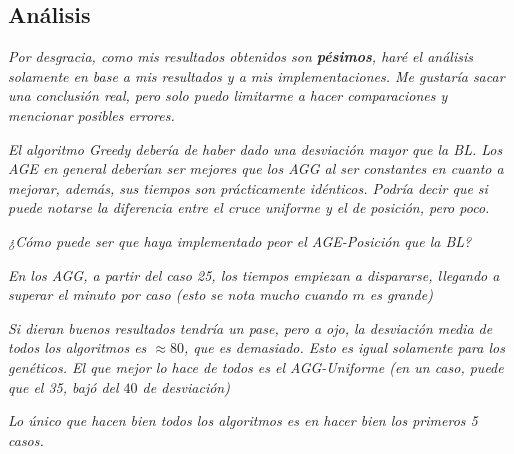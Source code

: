 \documentclass{article}
\begin{document}
    \pagebreak
    \subsection{Análisis}

    \emph{Por desgracia, como mis resultados obtenidos son \textbf{pésimos}, haré el análisis
    solamente en base a mis resultados y a mis implementaciones. Me gustaría sacar una conclusión real,
    pero solo puedo limitarme a hacer comparaciones y mencionar posibles errores.}

    \emph{El algoritmo Greedy debería de haber dado una desviación mayor que la BL.
    Los AGE en general deberían ser mejores que los AGG al ser constantes en cuanto a mejorar, además, sus tiempos son prácticamente idénticos.
    Podría decir que si puede notarse la diferencia entre el cruce uniforme y el de posición,
    pero poco.
    }

    \emph{¿Cómo puede ser que haya implementado peor el AGE-Posición que la BL?}

    \emph{En los AGG, a partir del caso 25, los tiempos empiezan a dispararse,
    llegando a superar el minuto por caso (esto se nota mucho cuando $m$ es grande)}

    \emph{Si dieran buenos resultados tendría un pase, pero a ojo,
    la desviación media de todos los algoritmos es $\approx 80$, que es demasiado. Esto es igual solamente para los genéticos.
    El que mejor lo hace de todos es el AGG-Uniforme (en un caso, puede que el 35, bajó del $40$ de desviación)}

    \emph{Lo único que hacen bien todos los algoritmos es en hacer bien los primeros 5 casos.}
\end{document}

